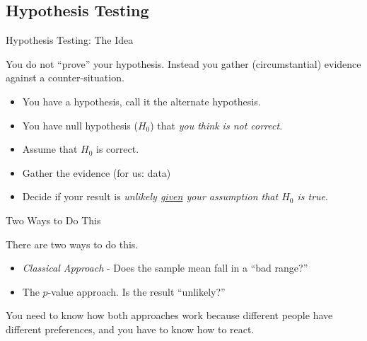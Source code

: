 \subsection{Hypothesis Testing}

\begin{frame}{Hypothesis Testing: The Idea}

  You do not ``prove'' your hypothesis. Instead you gather
  (circumstantial) evidence against a counter-situation.

  \begin{itemize}
  \item You have a hypothesis, call it the alternate hypothesis.
  \item You have null hypothesis ($H_0$) that \textit{\color{red}you think is not correct}.
  \item Assume that $H_0$ is correct.
  \item Gather the evidence (for us: data)
  \item Decide if your result is \textit{\color{red}unlikely \underline{given}
      your assumption that $H_0$ is true}.
  \end{itemize}


\end{frame}

\begin{frame}{Two Ways to Do This}

    There are two ways to do this. 

    \begin{itemize}
    \item \textit{Classical Approach} - Does the sample mean fall in a
      ``bad range?''
    \item The $p$-value approach. Is the result ``unlikely?''
    \end{itemize}

    You need to know how both approaches work because different people
    have different preferences, and you have to know how to react.
  
\end{frame}

